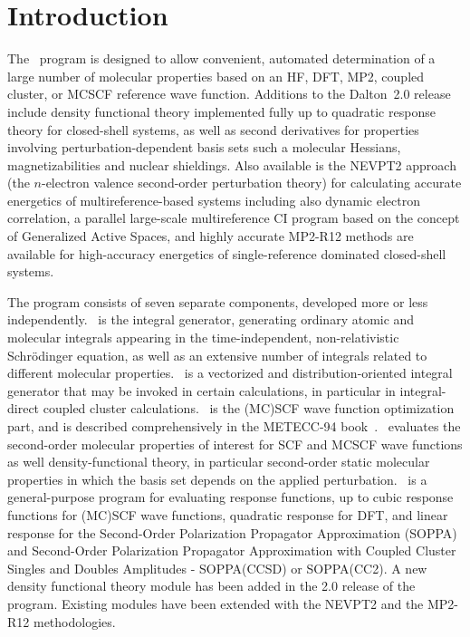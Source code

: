 \chapter{Introduction}\label{ch:intro}

The \dalton\ program is designed to allow convenient,
automated determination of a large number of molecular properties
based on an HF, DFT, MP2, coupled cluster, or MCSCF reference wave
function. Additions to the Dalton~2.0 release include
density functional theory implemented fully up to quadratic response
theory for closed-shell systems, as well as second derivatives for
properties involving perturbation-dependent basis sets such a
molecular Hessians, magnetizabilities and nuclear shieldings. Also
available is the NEVPT2 approach
(the $n$-electron valence second-order perturbation theory) for
calculating  accurate energetics of
multireference-based systems including also dynamic electron
correlation, a parallel large-scale multireference CI program based on the concept of
Generalized Active Spaces, and highly accurate MP2-R12
 methods are available for high-accuracy energetics of
single-reference dominated closed-shell systems.

 The program consists
of seven separate components, developed more or less independently.
\her\ is the integral generator, generating ordinary
atomic and molecular integrals appearing in the
time-independent, non-relativistic Schr\"{o}dinger equation, as well as
an extensive number of integrals related to different molecular
properties. \eri\ is a vectorized and distribution-oriented integral
generator that may be invoked in certain calculations, in particular in
integral-direct coupled cluster calculations. \sir\ is the (MC)SCF wave
function optimization part, and is described comprehensively in the
METECC-94 book~\cite{hjajhajomotecc}. \aba\ evaluates the second-order
molecular properties of interest for SCF and MCSCF wave functions as
well density-functional theory, in particular second-order static
molecular properties in which the basis set depends on the applied
perturbation. \resp\ is a general-purpose program for evaluating
response functions, up to cubic response functions for (MC)SCF wave
functions, quadratic response for DFT, and linear response for the
Second-Order Polarization Propagator Approximation (SOPPA) and
Second-Order Polarization Propagator Approximation with Coupled Cluster
Singles and Doubles Amplitudes - SOPPA(CCSD) or SOPPA(CC2). A new
density functional theory module has been added in the 2.0 release of
the program. Existing modules have been extended with the NEVPT2 and
the MP2-R12 methodologies.

